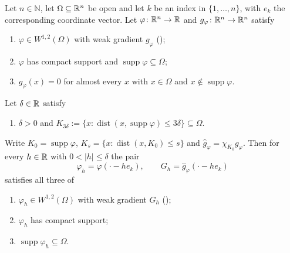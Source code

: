 \begin{helper}
Let $n\in\mathbb{N}$, let $\Omega\subseteq\mathbb{R}^n$ be open and let $k$ be an index
in $\{1,\dots,n\}$, with $e_k$ the corresponding coordinate vector.  Let
$\varphi\colon\mathbb{R}^n\to\mathbb{R}$ and $g_\varphi\colon\mathbb{R}^n\to\mathbb{R}^n$ satisfy
\begin{enumerate}
\item[(H1)] $\varphi\in W^{1,2}(\Omega)$ with weak gradient $g_\varphi$
  ();
\item[(H2)] $\varphi$ has compact support and
  $\operatorname{supp}\varphi\subseteq\Omega$;
\item[(H3)] $g_\varphi(x)=0$ for almost every $x$ with $x\in\Omega$ and
  $x\notin\operatorname{supp}\varphi$.
\end{enumerate}
Let $\delta\in\mathbb{R}$ satisfy
\begin{enumerate}
\item[(H4)] $\delta>0$ and
  $K_{3\delta}:=\{x:\operatorname{dist}(x,\operatorname{supp}\varphi)\le3\delta\}
  \subseteq\Omega$.
\end{enumerate}
Write $K_0=\operatorname{supp}\varphi$,
$K_s=\{x:\operatorname{dist}(x,K_0)\le s\}$ and
$\widehat g_\varphi=\chi_{K_0}g_\varphi$.  Then for every $h\in\mathbb{R}$ with
$0<|h|\le\delta$ the pair
\[
\varphi_h=\varphi(\cdot-he_k),
\qquad
G_h=\widehat g_\varphi(\cdot-he_k)
\]
satisfies all three of
\begin{enumerate}
\item[(i)] $\varphi_h\in W^{1,2}(\Omega)$ with weak gradient $G_h$
  ();
\item[(ii)] $\varphi_h$ has compact support;
\item[(iii)] $\operatorname{supp}\varphi_h\subseteq\Omega$.
\end{enumerate}
\end{helper}

